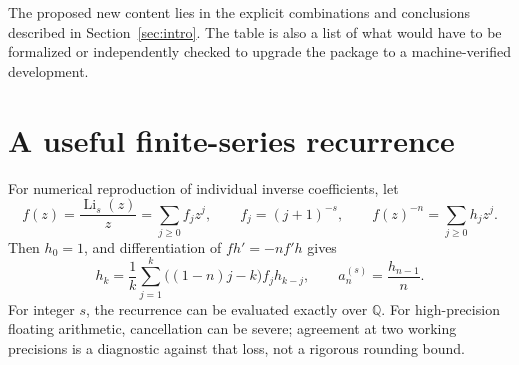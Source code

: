 \documentclass[11pt,a4paper]{article}
\numberwithin{equation}{section}
\theoremstyle{definition}
\theoremstyle{remark}
\DeclareMathOperator{\Li}{Li}
\begin{document}
The proposed new content lies in the explicit combinations and
conclusions described in Section~\ref{sec:intro}.  The table is also a
list of what would have to be formalized or independently checked to
upgrade the package to a machine-verified development.

\section{A useful finite-series recurrence}

For numerical reproduction of individual inverse coefficients, let
\[
 f(z)=\frac{\Li_s(z)}z=\sum_{j\ge0}f_jz^j,\qquad
 f_j=(j+1)^{-s},\qquad
 f(z)^{-n}=\sum_{j\ge0}h_jz^j.
\]
Then \(h_0=1\), and differentiation of \(f h'=-n f'h\) gives
\begin{equation}
 h_k=\frac1k\sum_{j=1}^k\bigl((1-n)j-k\bigr)f_jh_{k-j},
 \qquad a_n^{(s)}=\frac{h_{n-1}}n.
 \label{eq:finite-recurrence}
\end{equation}
For integer \(s\), the recurrence can be evaluated exactly over
\(\mathbb Q\).  For high-precision floating arithmetic, cancellation
can be severe; agreement at two working precisions is a diagnostic
against that loss, not a rigorous rounding bound.
\end{document}
